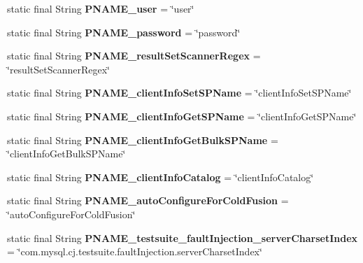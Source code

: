 \begin{DoxyCompactItemize}
static final String {\bfseries P\+N\+A\+M\+E\+\_\+user} = \char`\"{}user\char`\"{}
\item 
\mbox{\label{classcom_1_1mysql_1_1cj_1_1conf_1_1_property_definitions_a7e247bbbe85ec34ce7f63f5db4622759}} 
static final String {\bfseries P\+N\+A\+M\+E\+\_\+password} = \char`\"{}password\char`\"{}
\item 
\mbox{\label{classcom_1_1mysql_1_1cj_1_1conf_1_1_property_definitions_a0fa50d56636f8f4f5c9dbe35efdf98c6}} 
static final String {\bfseries P\+N\+A\+M\+E\+\_\+result\+Set\+Scanner\+Regex} = \char`\"{}result\+Set\+Scanner\+Regex\char`\"{}
\item 
\mbox{\label{classcom_1_1mysql_1_1cj_1_1conf_1_1_property_definitions_a0dd11dcd01b42cec3c4e90c09c97aa97}} 
static final String {\bfseries P\+N\+A\+M\+E\+\_\+client\+Info\+Set\+S\+P\+Name} = \char`\"{}client\+Info\+Set\+S\+P\+Name\char`\"{}
\item 
\mbox{\label{classcom_1_1mysql_1_1cj_1_1conf_1_1_property_definitions_a32c8533db286709287c16b558ed739b9}} 
static final String {\bfseries P\+N\+A\+M\+E\+\_\+client\+Info\+Get\+S\+P\+Name} = \char`\"{}client\+Info\+Get\+S\+P\+Name\char`\"{}
\item 
\mbox{\label{classcom_1_1mysql_1_1cj_1_1conf_1_1_property_definitions_af02265149172d18587bf6ea8874215be}} 
static final String {\bfseries P\+N\+A\+M\+E\+\_\+client\+Info\+Get\+Bulk\+S\+P\+Name} = \char`\"{}client\+Info\+Get\+Bulk\+S\+P\+Name\char`\"{}
\item 
\mbox{\label{classcom_1_1mysql_1_1cj_1_1conf_1_1_property_definitions_a86658c92ce8eecee2f63facaced20696}} 
static final String {\bfseries P\+N\+A\+M\+E\+\_\+client\+Info\+Catalog} = \char`\"{}client\+Info\+Catalog\char`\"{}
\item 
\mbox{\label{classcom_1_1mysql_1_1cj_1_1conf_1_1_property_definitions_ac79ee30bb7475ab6a2e606f2c60786d7}} 
static final String {\bfseries P\+N\+A\+M\+E\+\_\+auto\+Configure\+For\+Cold\+Fusion} = \char`\"{}auto\+Configure\+For\+Cold\+Fusion\char`\"{}
\item 
\mbox{\label{classcom_1_1mysql_1_1cj_1_1conf_1_1_property_definitions_a75dc743d07d54749b0e8d1b63c1d3f02}} 
static final String {\bfseries P\+N\+A\+M\+E\+\_\+testsuite\+\_\+fault\+Injection\+\_\+server\+Charset\+Index} = \char`\"{}com.\+mysql.\+cj.\+testsuite.\+fault\+Injection.\+server\+Charset\+Index\char`\"{}
\end{DoxyCompactItemize}


